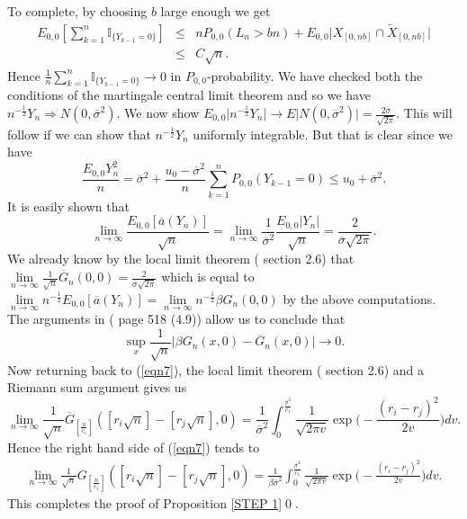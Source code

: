 \documentclass[11pt]{amsart}
\begin{document}
 
To complete, by choosing $b$ large enough we get
\begin{eqnarray*}
E_{0,0}[\sum_{k=1}^n \mathbb{I}_{\{ Y_{k-1}=0\}} ] &\le& n P_{0,0}(L_n >bn)+E_{0,0}\vert X_{[0,nb]} \cap \tilde{X}_{[0,nb]} \vert\\
&\le& C \sqrt{n}.
\end{eqnarray*} 
Hence $\frac{1}{n} \sum_{k=1}^n \mathbb{I}_{\lbrace Y_{k-1}=0 \rbrace} \to 0$ in $P_{0,0}$-probability. We have checked both the conditions of the martingale central limit theorem and so we have $n^{-\frac{1}{2}}Y_n \Rightarrow N(0,\overline{\sigma}^2)$. 
We now show $E_{0,0} \vert n^{-\frac{1}{2}} Y_n \vert \rightarrow E\vert N(0,\overline{\sigma}^2) \vert = \frac{2 \overline{\sigma}}{\sqrt{2\pi}} $. This will follow if we can show that $n^{-\frac{1}{2}}Y_n$ uniformly integrable. But that is clear since we have
\[ \frac{E_{0,0}Y_n^2}{n} = \overline{\sigma}^2+\frac{u_0-\overline{\sigma}^2}{n} \sum_{k=1}^n P_{0,0}(Y_{k-1}=0) \leq u_0 +\overline{\sigma}^2.\]
It is easily shown that 
\[ \lim \limits_{n \to \infty}\frac{E_{0,0}[\overline{a}(Y_n)]}{\sqrt{n}} = \lim \limits_{n \to \infty} \frac{1}{\overline{\sigma}^2}\frac{E_{0,0}\vert Y_n\vert}{\sqrt{n}} = \frac{2}{\overline{\sigma}\sqrt{2 \pi}}. \] 
We already know by the local limit theorem (\cite{durr} section 2.6) that $\lim \limits_{n\to \infty}\frac{1}{\sqrt{n}} \overline{G}_n(0,0)=\frac{2}{\overline{\sigma}\sqrt{2\pi}}$ which is equal to $\lim \limits_{n \to \infty}n^{-\frac{1}{2}}E_{0,0}[\overline{a}(Y_n)]=\lim \limits_{n\to \infty}n^{-\frac{1}{2}} \beta G_n(0,0)$ by the above computations. The arguments in (\cite{brs} page 518 (4.9)) allow us to conclude that 
\[ \sup_x \frac{1}{\sqrt{n}}\vert \beta G_n(x,0) - \overline{G}_n(x,0) \vert  \to 0.\] 
Now returning back to (\ref{eqn7}), the local limit theorem (\cite{durr} section 2.6) and a Riemann sum argument gives us 
\[ \lim \limits_{n \to \infty} \frac{1}{\sqrt{n}} \overline{G}_{[\frac{n}{c_1}]}([r_i\sqrt{n}]-[r_j \sqrt{n}],0)
=\frac{1}{\overline{\sigma}^2}\int_0^{\frac{\overline{\sigma}^2}{c_1}} \frac{1}{\sqrt{2\pi v}} \exp\big( -\frac{(r_i-r_j)^2}{2v} \big) dv.
\]
Hence the right hand side of (\ref{eqn7}) tends to  
\begin{eqnarray}
\label{green}
\lim \limits_{n \to \infty} \frac{1}{\sqrt{n}} G_{[\frac{n}{c_1}]}( [r_i\sqrt{n}]-[r_j\sqrt{n}],0) 
=\frac{1}{\beta \overline{\sigma}^2}\int_0^{\frac{\overline{\sigma}^2}{c_1}} \frac{1}{\sqrt{2\pi v}} \exp\big( -\frac{(r_i-r_j)^2}{2v} \big) dv.
\end{eqnarray}
This completes the proof of Proposition \ref{STEP 1}\qed.
\end{document}
